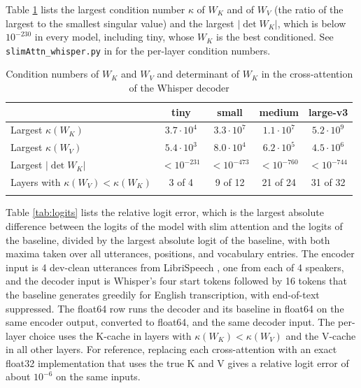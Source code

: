 \documentclass{article}
\def\fline{\Xhline{2\arrayrulewidth}}              %
\begin{document}
Table \ref{tab:cond} lists the largest condition number $\kappa$ of $W_K$ and of $W_V$ (the ratio of the largest to the smallest singular value) and the largest $\lvert\det W_K\rvert$, which is below $10^{-230}$ in every model, including tiny, whose $W_K$ is the best conditioned. See \texttt{slimAttn\_whisper.py} in \citep{tricks} for the per-layer condition numbers.

\begin{table}[h!] \centering
  \caption{Condition numbers of $W_K$ and $W_V$ and determinant of $W_K$ in the cross-attention of the Whisper decoder}
  \begin{tabular}{lcccc} \fline
                                          & tiny             & small            & medium           & large-v3         \\ \hline
  Largest $\kappa(W_K)$                   & $3.7 \cdot 10^4$ & $3.3 \cdot 10^7$ & $1.1 \cdot 10^7$ & $5.2 \cdot 10^9$ \\
  Largest $\kappa(W_V)$                   & $5.4 \cdot 10^3$ & $8.0 \cdot 10^4$ & $6.2 \cdot 10^5$ & $4.5 \cdot 10^6$ \\
  Largest $\lvert\det W_K\rvert$          & $< 10^{-231}$    & $< 10^{-473}$    & $< 10^{-760}$    & $< 10^{-744}$    \\
  Layers with $\kappa(W_V) < \kappa(W_K)$ & 3 of 4           & 9 of 12          & 21 of 24         & 31 of 32         \\ \fline
\end{tabular} \label{tab:cond} \end{table}

Table \ref{tab:logits} lists the relative logit error, which is the largest absolute difference between the logits of the model with slim attention and the logits of the baseline, divided by the largest absolute logit of the baseline, with both maxima taken over all utterances, positions, and vocabulary entries. The encoder input is 4 dev-clean utterances from LibriSpeech \citep{librispeech}, one from each of 4 speakers, and the decoder input is Whisper's four start tokens followed by 16 tokens that the baseline generates greedily for English transcription, with end-of-text suppressed. The float64 row runs the decoder and its baseline in float64 on the same encoder output, converted to float64, and the same decoder input. The per-layer choice uses the K-cache in layers with $\kappa(W_K) < \kappa(W_V)$ and the V-cache in all other layers. For reference, replacing each cross-attention with an exact float32 implementation that uses the true K and V gives a relative logit error of about $10^{-6}$ on the same inputs.
\end{document}
